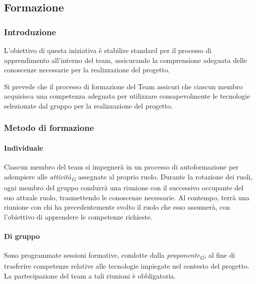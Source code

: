 \subsection{Formazione}
\subsubsection{Introduzione}
L'obiettivo di questa iniziativa è stabilire standard per il processo di apprendimento all'interno del team, assicurando la comprensione adeguata delle conoscenze necessarie per la realizzazione del progetto.

\vspace*{0.1cm}

Si prevede che il processo di formazione del Team assicuri che ciascun membro acquisisca una competenza adeguata per utilizzare consapevolmente le tecnologie selezionate dal gruppo per la realizzazione del progetto.

\subsubsection{Metodo di formazione}
\paragraph{Individuale}
Ciascun membro del team si impegnerà in un processo di autoformazione per adempiere alle \textit{attività}\textsubscript{\textit{G}} assegnate al proprio ruolo. Durante la rotazione dei ruoli, ogni membro del gruppo condurrà una riunione con il successivo occupante del suo attuale ruolo, trasmettendo le conoscenze necessarie. Al contempo, terrà una riunione con chi ha precedentemente svolto il ruolo che esso assumerà, con l'obiettivo di apprendere le competenze richieste. 

\paragraph{Di gruppo}
Sono programmate sessioni formative, condotte dalla \textit{proponente}\textsubscript{\textit{G}}, al fine di trasferire competenze relative alle tecnologie impiegate nel contesto del progetto. La partecipazione del team a tali riunioni è obbligatoria. 
